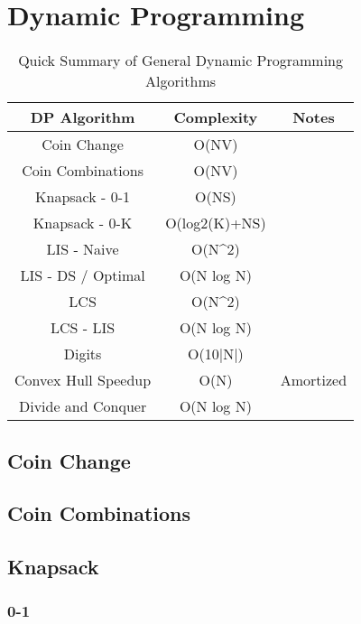 \documentclass{article}
\begin{document}
\section{Dynamic Programming}

\begin{table}[H]
\begin{tabular}{|c|c|c|}
\hline
DP Algorithm        & Complexity              & Notes     \\ \hline
Coin Change         & O(NV)                   &           \\ \hline
Coin Combinations   & O(NV)                   &           \\ \hline
Knapsack - 0-1      & O(NS)                   &           \\ \hline
Knapsack - 0-K      & O(log2(K)+NS)           &           \\ \hline
LIS - Naive         & O(N\textasciicircum{}2) &           \\ \hline
LIS - DS / Optimal  & O(N log N)              &           \\ \hline
LCS                 & O(N\textasciicircum{}2) &           \\ \hline
LCS - LIS           & O(N log N)              &           \\ \hline
Digits              & O(10|N|)                &           \\ \hline
Convex Hull Speedup & O(N)                    & Amortized \\ \hline
Divide and Conquer  & O(N log N)              &           \\ \hline
\end{tabular}
\caption{Quick Summary of General Dynamic Programming Algorithms}
\label{tab:dp}
\end{table}

\subsection{Coin Change}

\subsection{Coin Combinations}


\subsection{Knapsack}
\subsubsection{0-1}

\end{document}
